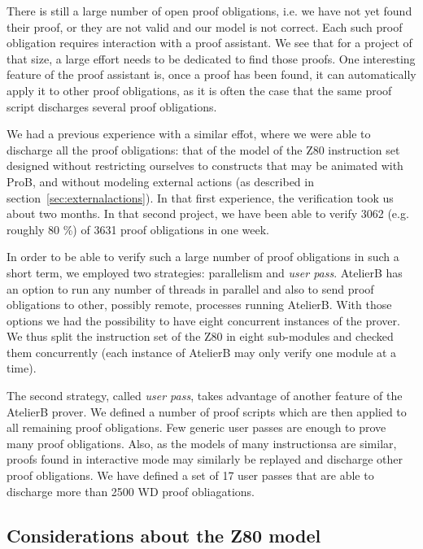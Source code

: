 \documentclass[a4paper]{llncs}
\begin{document}


There is still a large number of open proof obligations, i.e. we have
not yet found their proof, or they are not valid and our model is not
correct. Each such proof obligation requires interaction with a proof
assistant. We see that for a project of that size, a large effort
needs to be dedicated to find those proofs. One interesting feature of
the proof assistant is, once a proof has been found, it can
automatically apply it to other proof obligations, as it is often the
case that the same proof script discharges several proof obligations.

We had a previous experience with a similar effot, where we were able
to discharge all the proof obligations: that of the model of the Z80
instruction set designed without restricting ourselves to constructs
that may be animated with ProB, and without modeling external actions
(as described in section~\ref{sec:externalactions}). In that first
experience, the verification took us about two months. In that second
project, we have been able to verify 3062 (e.g. roughly 80 \%) of 3631
proof obligations in one week.

In order to be able to verify such a large number of proof obligations
in such a short term, we employed two strategies: parallelism and
\emph{user pass}. AtelierB has an option to run any number of threads
in parallel and also to send proof obligations to other, possibly
remote, processes running AtelierB. With those options we had the
possibility to have eight concurrent instances of the prover. We thus
split the instruction set of the Z80 in eight sub-modules and checked
them concurrently (each instance of AtelierB may only verify one module
at a time).  

The second strategy, called \emph{user pass}, takes advantage of
another feature of the AtelierB prover. We defined a number of proof
scripts which are then applied to all remaining proof obligations. Few
generic user passes are enough to prove many proof obligations. Also,
as the models of many instructionsa are similar, proofs found in
interactive mode may similarly be replayed and discharge other proof
obligations. We have defined a set of 17 user passes that are able
to discharge more than 2500 WD proof obliagations.


\subsection{Considerations about the Z80 model}
\end{document}
